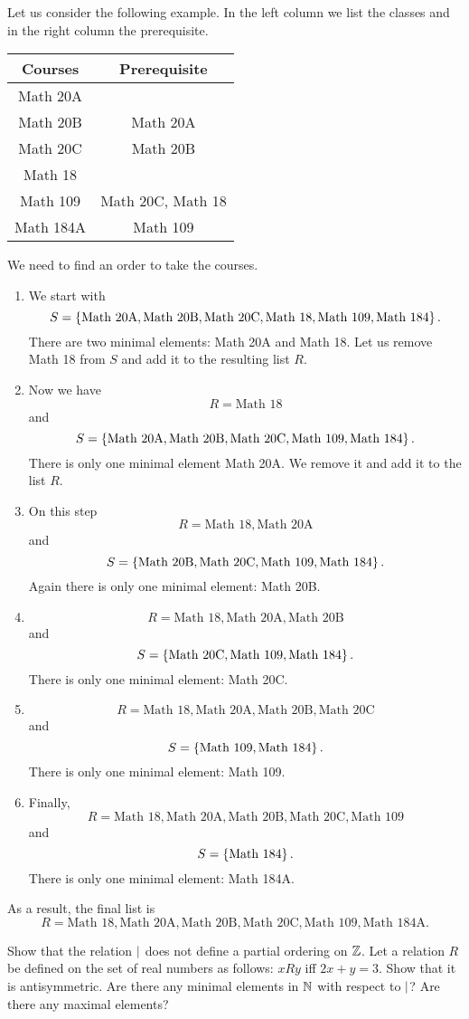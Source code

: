 Let us consider the following example. In the left column we list the classes
and in the right column the prerequisite.
\begin{center}
  \begin{tabular}{c | c}
    Courses & Prerequisite \\
    \hline
    Math 20A \\
    Math 20B & Math 20A \\
    Math 20C & Math 20B \\
    Math 18 \\
    Math 109 & Math 20C, Math 18 \\
    Math 184A & Math 109
  \end{tabular}
\end{center}
We need to find an order to take the courses.
\begin{enumerate}
  \item We start with
    \[
      S = \set{\text{Math 20A}, \text{Math 20B},
        \text{Math 20C}, \text{Math 18}, \text{Math 109}, \text{Math 184}}.
    \]
    There are two minimal elements: Math 20A and Math 18. Let us remove Math 18
    from $S$ and add it to the resulting list $R$.
  \item Now we have
    \[
      R = \text{Math 18}
    \]
    and
    \[
      S = \set{\text{Math 20A},
      \text{Math 20B}, \text{Math 20C}, \text{Math 109}, \text{Math 184}}.
    \]
    There is only one minimal element Math 20A. We remove it and add it to the
    list $R$.
  \item On this step
    \[
      R = \text{Math 18}, \text{Math 20A}
    \]
    and
    \[
      S = \set{
        \text{Math 20B}, \text{Math 20C}, \text{Math 109}, \text{Math 184}}.
    \]
    Again there is only one minimal element: Math 20B.
  \item
    \[
      R = \text{Math 18}, \text{Math 20A}, \text{Math 20B}
    \] and
    \[
      S = \set{\text{Math 20C}, \text{Math 109}, \text{Math 184}}.
    \]
    There is only one minimal element: Math 20C.
  \item
    \[
      R = \text{Math 18}, \text{Math 20A}, \text{Math 20B}, \text{Math 20C}
    \]
    and
    \[
      S = \set{\text{Math 109}, \text{Math 184}}.
    \]
    There is only one minimal element: Math 109.
  \item Finally,
    \[
      R = \text{Math 18}, \text{Math 20A}, \text{Math 20B}, \text{Math 20C},
      \text{Math 109}
    \]
    and
    \[
      S = \set{\text{Math 184}}.
    \]
    There is only one minimal element: Math 184A.
\end{enumerate}
As a result, the final list is
\[
  R = \text{Math 18}, \text{Math 20A}, \text{Math 20B}, \text{Math 20C},
  \text{Math 109}, \text{Math 184A}.
\]


\begin{chapterendexercises}
  \exercise[recommended] Show that the relation $\mid$ does not define a partial
    ordering on $\mathbb{Z}$.
  \exercise Let a relation $R$ be defined on the set of real numbers as
    follows: $x R y$ iff $2x + y = 3$. Show that it is antisymmetric.
  \exercise Are there any minimal elements in $\mathbb{N}$ with respect to
    $\mid$? Are there any maximal elements?
\end{chapterendexercises}
